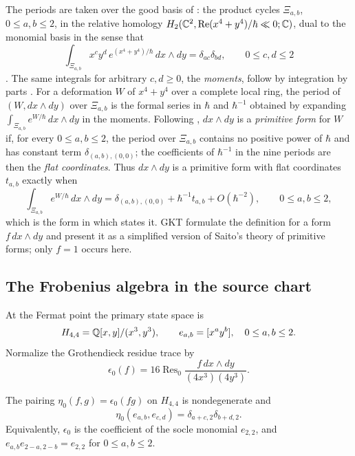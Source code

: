 The periods are taken over the good basis of
\cite[\S4.1]{grossetal2022open}: the product cycles $\Xi_{a,b}$,
$0\leq a,b\leq2$, in the relative homology
$H_2(\mathbb C^2,\operatorname{Re}(x^4+y^4)/\hbar\ll0;\mathbb C)$, dual to the
monomial basis in the sense that
\[
 \int_{\Xi_{a,b}}x^cy^d\,e^{(x^4+y^4)/\hbar}\,dx\wedge dy
 =\delta_{ac}\delta_{bd},
 \qquad 0\leq c,d\leq2
\]
\cite[(4.3)]{grossetal2022open}.  The same integrals for arbitrary
$c,d\geq0$, the \emph{moments}, follow by integration by parts
\cite[Lem.~4.2]{grossetal2022open}.  For a deformation $W$ of $x^4+y^4$ over
a complete local ring, the period of $(W,dx\wedge dy)$ over $\Xi_{a,b}$ is
the formal series in $\hbar$ and $\hbar^{-1}$ obtained by expanding
$\int_{\Xi_{a,b}}e^{W/\hbar}\,dx\wedge dy$ in the moments.  Following
\cite[Def.~4.3]{grossetal2022open}, $dx\wedge dy$ is a \emph{primitive form}
for $W$ if, for every $0\leq a,b\leq2$, the period over $\Xi_{a,b}$ contains
no positive power of $\hbar$ and has constant term
$\delta_{(a,b),(0,0)}$; the coefficients of $\hbar^{-1}$ in the nine periods
are then the \emph{flat coordinates}.  Thus $dx\wedge dy$ is a primitive
form with flat coordinates $t_{a,b}$ exactly when
\[
 \int_{\Xi_{a,b}}e^{W/\hbar}\,dx\wedge dy
 =\delta_{(a,b),(0,0)}+\hbar^{-1}t_{a,b}+O(\hbar^{-2}),
 \qquad 0\leq a,b\leq2,
\]
which is the form in which \cite[Cor.~4.17]{grossetal2022open} states it.
GKT formulate the definition for a form $f\,dx\wedge dy$ and present it as
a simplified version of Saito's theory of primitive forms; only $f=1$ occurs
here.

\subsection{The Frobenius algebra in the source chart}
\label{subsec:source-Frobenius}

At the Fermat point the primary state space is
\begin{equation}\label{eq:Fermat-Jacobian}
 H_{4,4}=\mathbb Q[x,y]/(x^3,y^3),
 \qquad e_{a,b}=[x^ay^b],\quad 0\leq a,b\leq2.
\end{equation}
Normalize the Grothendieck residue trace by
\begin{equation}\label{eq:residue-trace}
 \epsilon_0(f)
 =16\operatorname{Res}_0
   \frac{f\,dx\wedge dy}{(4x^3)(4y^3)}.
\end{equation}

\begin{proposition}
\label{prop:classical-vertex}
The pairing $\eta_0(f,g)=\epsilon_0(fg)$ on $H_{4,4}$ is nondegenerate and
\begin{equation}\label{eq:classical-pairing}
 \eta_0(e_{a,b},e_{c,d})
 =\delta_{a+c,2}\delta_{b+d,2}.
\end{equation}
Equivalently, $\epsilon_0$ is the coefficient of the socle monomial
$e_{2,2}$, and $e_{a,b}e_{2-a,2-b}=e_{2,2}$ for $0\leq a,b\leq2$.
\end{proposition}

